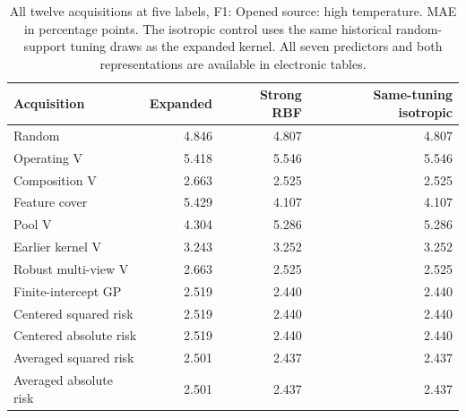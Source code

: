 \begin{table}[htbp]\centering\small
\caption{All twelve acquisitions at five labels, F1: Opened source: high temperature. MAE in percentage points. The isotropic control uses the same historical random-support tuning draws as the expanded kernel. All seven predictors and both representations are available in electronic tables.}\label{tab:step10all3}
\begin{tabular}{lrrr}\toprule
Acquisition & Expanded & Strong RBF & Same-tuning isotropic \\ \midrule
Random & 4.846 & 4.807 & 4.807 \\
Operating V & 5.418 & 5.546 & 5.546 \\
Composition V & 2.663 & 2.525 & 2.525 \\
Feature cover & 5.429 & 4.107 & 4.107 \\
Pool V & 4.304 & 5.286 & 5.286 \\
Earlier kernel V & 3.243 & 3.252 & 3.252 \\
Robust multi-view V & 2.663 & 2.525 & 2.525 \\
Finite-intercept GP & 2.519 & 2.440 & 2.440 \\
Centered squared risk & 2.519 & 2.440 & 2.440 \\
Centered absolute risk & 2.519 & 2.440 & 2.440 \\
Averaged squared risk & 2.501 & 2.437 & 2.437 \\
Averaged absolute risk & 2.501 & 2.437 & 2.437 \\
\bottomrule\end{tabular}
\end{table}
